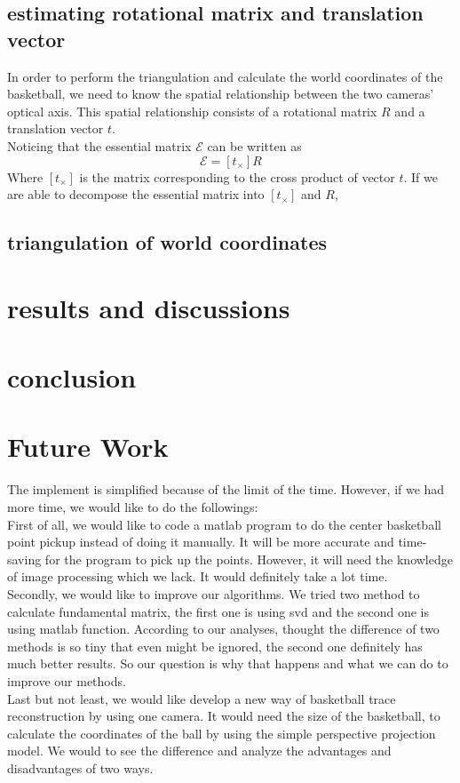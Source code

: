 \documentclass[10pt,journal,compsoc]{IEEEtran}
\begin{document}
\subsection{estimating rotational matrix and translation vector}
In order to perform the triangulation and calculate the world coordinates of the basketball, 
we need to know the spatial relationship between the two cameras' optical axis. This spatial relationship 
consists of a rotational matrix $R$ and a translation vector $t$.\\
Noticing that the essential matrix $\mathcal{E}$ can be written as 
\begin{equation}
\mathcal{E} = [t_{\times}]R
\end{equation}
Where $[t_{\times}]$ is the matrix corresponding to the cross product of vector $t$. If we are able to 
decompose the essential matrix into $[t_{\times}]$ and $R$, 
\subsection{triangulation of world coordinates}
\section{\textbf{results and discussions}}
\section{\textbf{conclusion}}
\section{\textbf{Future Work}}
The implement is simplified because of the limit of the time. However, if we had more time, we would like to do the followings:
\\First of all, we would like to code a matlab program to do the center basketball point pickup instead of doing it manually. It will be more accurate and time-saving for the program to pick up the points. However, it will need the knowledge of image processing which we lack. It would definitely take a lot time.
\\Secondly, we would like to improve our algorithms. We tried two method to calculate fundamental matrix, the first one is using svd and the second one is using matlab function. According to our analyses, thought the difference of two methods is so tiny that even might be ignored, the second one definitely has much better results. So our question is why that happens and what we can do to improve our methods.
\\Last but not least, we would like develop a new way of basketball trace reconstruction by using one camera. It would need the size of the basketball, to calculate the coordinates of the ball by using the simple perspective projection model. We would to see the difference and analyze the advantages and disadvantages of two ways.
\end{document}
